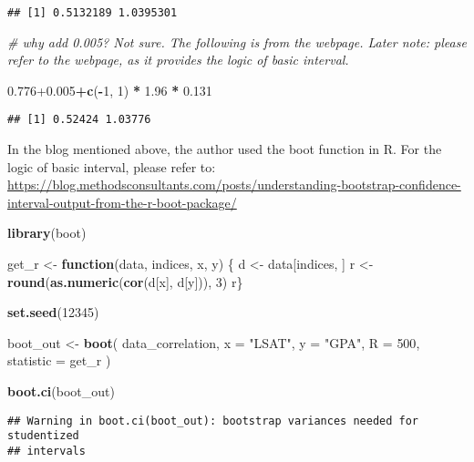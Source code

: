 \documentclass[]{book}
\newenvironment{Shaded}{\begin{snugshade}}{\end{snugshade}}
\newcommand{\CommentTok}[1]{\textcolor[rgb]{0.56,0.35,0.01}{\textit{#1}}}
\newcommand{\ControlFlowTok}[1]{\textcolor[rgb]{0.13,0.29,0.53}{\textbf{#1}}}
\newcommand{\DataTypeTok}[1]{\textcolor[rgb]{0.13,0.29,0.53}{#1}}
\newcommand{\DecValTok}[1]{\textcolor[rgb]{0.00,0.00,0.81}{#1}}
\newcommand{\FloatTok}[1]{\textcolor[rgb]{0.00,0.00,0.81}{#1}}
\newcommand{\KeywordTok}[1]{\textcolor[rgb]{0.13,0.29,0.53}{\textbf{#1}}}
\newcommand{\NormalTok}[1]{#1}
\newcommand{\OperatorTok}[1]{\textcolor[rgb]{0.81,0.36,0.00}{\textbf{#1}}}
\newcommand{\StringTok}[1]{\textcolor[rgb]{0.31,0.60,0.02}{#1}}
\begin{document}
\begin{verbatim}
## [1] 0.5132189 1.0395301
\end{verbatim}

\begin{Shaded}
\begin{Highlighting}[]
\CommentTok{# why add 0.005? Not sure. The following is from the webpage. Later note: please refer to the webpage, as it provides the logic of basic interval.}

\FloatTok{0.776+0.005}\OperatorTok{+}\KeywordTok{c}\NormalTok{(}\OperatorTok{-}\DecValTok{1}\NormalTok{, }\DecValTok{1}\NormalTok{) }\OperatorTok{*}\StringTok{ }\FloatTok{1.96} \OperatorTok{*}\StringTok{ }\FloatTok{0.131}
\end{Highlighting}
\end{Shaded}

\begin{verbatim}
## [1] 0.52424 1.03776
\end{verbatim}

In the blog mentioned above, the author used the boot function in R. For the logic of basic interval, please refer to:
\url{https://blog.methodsconsultants.com/posts/understanding-bootstrap-confidence-interval-output-from-the-r-boot-package/}

\begin{Shaded}
\begin{Highlighting}[]
\KeywordTok{library}\NormalTok{(boot)}

\NormalTok{get_r <-}\StringTok{ }\ControlFlowTok{function}\NormalTok{(data, indices, x, y) \{}
\NormalTok{  d <-}\StringTok{ }\NormalTok{data[indices, ]}
\NormalTok{  r <-}\StringTok{ }\KeywordTok{round}\NormalTok{(}\KeywordTok{as.numeric}\NormalTok{(}\KeywordTok{cor}\NormalTok{(d[x], d[y])), }\DecValTok{3}\NormalTok{)}
\NormalTok{  r\}}

\KeywordTok{set.seed}\NormalTok{(}\DecValTok{12345}\NormalTok{)}

\NormalTok{boot_out <-}\StringTok{ }\KeywordTok{boot}\NormalTok{(}
\NormalTok{  data_correlation,}
  \DataTypeTok{x =} \StringTok{"LSAT"}\NormalTok{, }
  \DataTypeTok{y =} \StringTok{"GPA"}\NormalTok{, }
  \DataTypeTok{R =} \DecValTok{500}\NormalTok{,}
  \DataTypeTok{statistic =}\NormalTok{ get_r}
\NormalTok{)}

\KeywordTok{boot.ci}\NormalTok{(boot_out)}
\end{Highlighting}
\end{Shaded}

\begin{verbatim}
## Warning in boot.ci(boot_out): bootstrap variances needed for studentized
## intervals
\end{verbatim}
\end{document}
